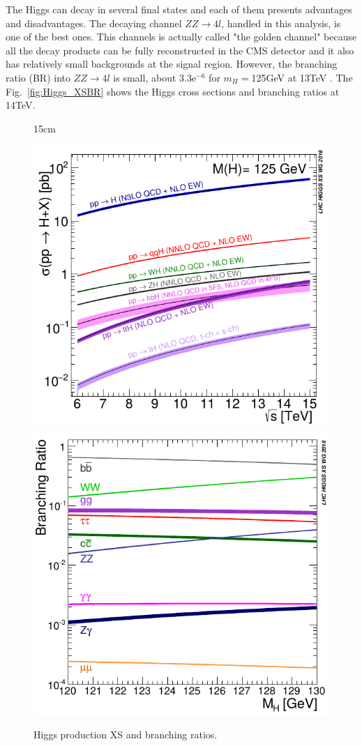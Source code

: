 The Higgs can decay in several final states and each of them presents advantages and disadvantages. The decaying channel $ZZ \rightarrow 4l$, handled in this analysis, is one of the best ones. This channels is actually called "the golden channel" because all the decay products can be fully reconstructed in the CMS detector and it also has relatively small backgrounds at the signal region. However, the branching ratio (BR) into $ZZ \rightarrow 4l$ is small, about 3.3e$^{-6}$ for $m_{H} = $125GeV at 13TeV \cite{bib:LHC-Higgs-XSWG-2018}. The Fig.~\ref{fig:Higgs_XSBR} shows the Higgs cross sections and branching ratios at 14TeV.

\begin{figure}[htbp]{15cm}
	\caption{Higgs production XS and branching ratios.}
	\includegraphics[scale=0.4]{ChapterTheory/figs/Higgs_XS_vs_S.png}
	\quad
	\includegraphics[scale=0.4]{ChapterTheory/figs/Higgs_BRs.png}

\end{figure}
